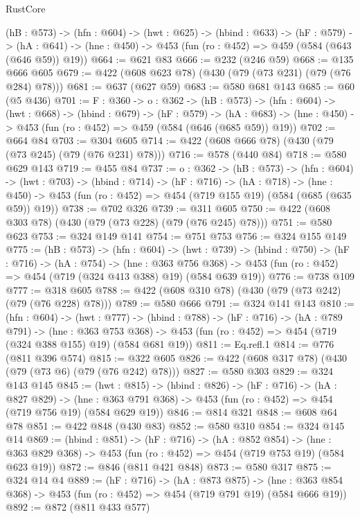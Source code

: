 \begin{lexlean}{RustCore}
\begin{coremodule}
  (hB : @573) ->
  (hfn : @604) ->
  (hwt : @625) ->
  (hbind : @633) ->
  (hF : @579) ->
  (hA : @641) -> (hne : @450) -> @453 (fun (ro : @452) => @459 (@584 (@643 (@646 @59)) @19))
@664 := @621 @83
@666 := @232 (@246 @59)
@668 := @135 @666 @605
@679 := @422 (@608 @623 @78) (@430 (@79 (@73 @231) (@79 (@76 @284) @78)))
@681 := @637 (@627 @59)
@683 := @580 @681 @143
@685 := @60 (@5 @436)
@701 := {F : @360} ->
  {o : @362} ->
  (hB : @573) ->
  (hfn : @604) ->
  (hwt : @668) ->
  (hbind : @679) ->
  (hF : @579) ->
  (hA : @683) -> (hne : @450) -> @453 (fun (ro : @452) => @459 (@584 (@646 (@685 @59)) @19))
@702 := @664 @84
@703 := @304 @605
@714 := @422 (@608 @666 @78) (@430 (@79 (@73 @245) (@79 (@76 @231) @78)))
@716 := @578 (@440 @84)
@718 := @580 @629 @143
@719 := @455 @84
@737 := {o : @362} ->
  (hB : @573) ->
  (hfn : @604) ->
  (hwt : @703) ->
  (hbind : @714) ->
  (hF : @716) ->
  (hA : @718) ->
  (hne : @450) -> @453 (fun (ro : @452) => @454 (@719 @155 @19) (@584 (@685 (@635 @59)) @19))
@738 := @702 @326
@739 := @311 @605
@750 := @422 (@608 @303 @78) (@430 (@79 (@73 @228) (@79 (@76 @245) @78)))
@751 := @580 @623
@753 := @324 @149 @141
@754 := @751 @753
@756 := @324 @155 @149
@775 := (hB : @573) ->
  (hfn : @604) ->
  (hwt : @739) ->
  (hbind : @750) ->
  (hF : @716) ->
  (hA : @754) ->
  (hne : @363 @756 @368) ->
  @453 (fun (ro : @452) => @454 (@719 (@324 @413 @388) @19) (@584 @639 @19))
@776 := @738 @109
@777 := @318 @605
@788 := @422 (@608 @310 @78) (@430 (@79 (@73 @242) (@79 (@76 @228) @78)))
@789 := @580 @666
@791 := @324 @141 @143
@810 := (hfn : @604) ->
  (hwt : @777) ->
  (hbind : @788) ->
  (hF : @716) ->
  (hA : @789 @791) ->
  (hne : @363 @753 @368) ->
  @453 (fun (ro : @452) => @454 (@719 (@324 @388 @155) @19) (@584 @681 @19))
@811 := Eq.refl.{1}
@814 := @776 (@811 @396 @574)
@815 := @322 @605
@826 := @422 (@608 @317 @78) (@430 (@79 (@73 @6) (@79 (@76 @242) @78)))
@827 := @580 @303
@829 := @324 @143 @145
@845 := (hwt : @815) ->
  (hbind : @826) ->
  (hF : @716) ->
  (hA : @827 @829) ->
  (hne : @363 @791 @368) -> @453 (fun (ro : @452) => @454 (@719 @756 @19) (@584 @629 @19))
@846 := @814 @321
@848 := @608 @64 @78
@851 := @422 @848 (@430 @83)
@852 := @580 @310
@854 := @324 @145 @14
@869 := (hbind : @851) ->
  (hF : @716) ->
  (hA : @852 @854) ->
  (hne : @363 @829 @368) -> @453 (fun (ro : @452) => @454 (@719 @753 @19) (@584 @623 @19))
@872 := @846 (@811 @421 @848)
@873 := @580 @317
@875 := @324 @14 @4
@889 := (hF : @716) ->
  (hA : @873 @875) ->
  (hne : @363 @854 @368) -> @453 (fun (ro : @452) => @454 (@719 @791 @19) (@584 @666 @19))
@892 := @872 (@811 @433 @577)

\end{coremodule}
\end{lexlean}
